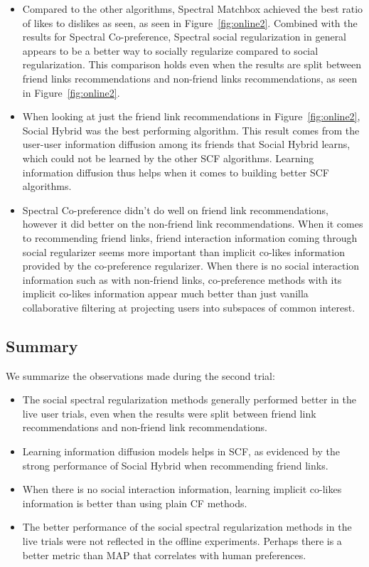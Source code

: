 \begin{itemize}
\item{Compared to the other algorithms, Spectral Matchbox achieved the
best ratio of likes to dislikes as seen, as seen in
Figure~\ref{fig:online2}. Combined with the results for Spectral
Co-preference, Spectral social regularization in general appears to be
a better way to socially regularize compared to social
regularization. This comparison holds even when the results are split
between friend links recommendations and non-friend links
recommendations, as seen in Figure~\ref{fig:online2}.}

\item{When looking at just the friend link recommendations in
Figure~\ref{fig:online2}, Social Hybrid was the best performing
algorithm. This result comes from the user-user information diffusion
among its friends that Social Hybrid learns, which could not be
learned by the other SCF algorithms. Learning information diffusion
thus helps when it comes to building better SCF algorithms.}

\item{Spectral Co-preference didn't do well on friend link
recommendations, however it did better on the non-friend link
recommendations. When it comes to recommending friend links, friend
interaction information coming through social regularizer seems more
important than implicit co-likes information provided by the
co-preference regularizer. When there is no social interaction
information such as with non-friend links, co-preference methods with
its implicit co-likes information appear much better than just vanilla
collaborative filtering at projecting users into subspaces of common
interest.}
\end{itemize}

\subsection{Summary}

We summarize the observations made during the second trial:

\begin{itemize}
\item{The social spectral regularization methods generally performed
better in the live user trials, even when the results were split
between friend link recommendations and non-friend link
recommendations.}

\item{Learning information diffusion models helps in SCF, as evidenced
by the strong performance of Social Hybrid when recommending friend
links.}

\item{When there is no social interaction information, learning
implicit co-likes information is better than using plain CF methods.}

\item{The better performance of the social spectral regularization
methods in the live trials were not reflected in the offline
experiments. Perhaps there is a better metric than MAP that correlates
with human preferences.}
\end{itemize}

